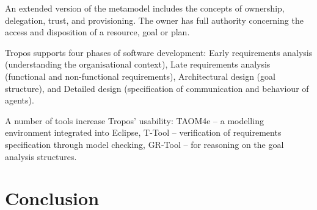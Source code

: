 \documentclass{article}
\begin{document}
An extended version of the metamodel includes the concepts of ownership, delegation, trust, and provisioning. The owner has full authority concerning the access and disposition of a resource, goal or plan.

Tropos supports four phases of software development: Early requirements analysis (understanding the organisational context), Late requirements analysis (functional and non-functional requirements), Architectural design (goal structure), and Detailed design (specification of communication and behaviour of agents). 

A number of tools increase Tropos' usability: TAOM4e -- a modelling environment integrated into Eclipse, T-Tool -- verification of requirements specification through model checking, GR-Tool -- for reasoning on the goal analysis structures.

\section{Conclusion}



\end{document}
